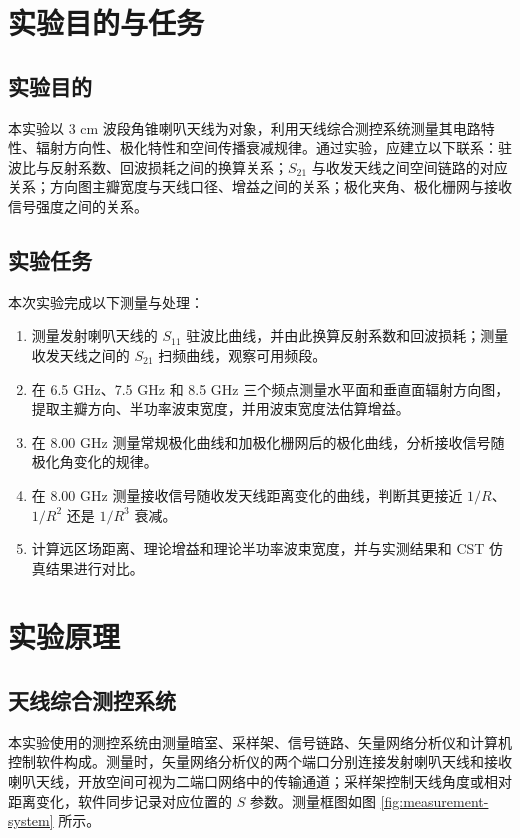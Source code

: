 \documentclass{ctexart}
\begin{document}
\makecover
\makecoveri
\zdx

\section{实验目的与任务}

\subsection{实验目的}

本实验以 3 cm 波段角锥喇叭天线为对象，利用天线综合测控系统测量其电路特性、辐射方向性、极化特性和空间传播衰减规律。通过实验，应建立以下联系：驻波比与反射系数、回波损耗之间的换算关系；$S_{21}$ 与收发天线之间空间链路的对应关系；方向图主瓣宽度与天线口径、增益之间的关系；极化夹角、极化栅网与接收信号强度之间的关系。

\subsection{实验任务}

本次实验完成以下测量与处理：
\begin{enumerate}
  \item 测量发射喇叭天线的 $S_{11}$ 驻波比曲线，并由此换算反射系数和回波损耗；测量收发天线之间的 $S_{21}$ 扫频曲线，观察可用频段。
  \item 在 6.5 GHz、7.5 GHz 和 8.5 GHz 三个频点测量水平面和垂直面辐射方向图，提取主瓣方向、半功率波束宽度，并用波束宽度法估算增益。
  \item 在 8.00 GHz 测量常规极化曲线和加极化栅网后的极化曲线，分析接收信号随极化角变化的规律。
  \item 在 8.00 GHz 测量接收信号随收发天线距离变化的曲线，判断其更接近 $1/R$、$1/R^2$ 还是 $1/R^3$ 衰减。
  \item 计算远区场距离、理论增益和理论半功率波束宽度，并与实测结果和 CST 仿真结果进行对比。
\end{enumerate}

\section{实验原理}

\subsection{天线综合测控系统}

本实验使用的测控系统由测量暗室、采样架、信号链路、矢量网络分析仪和计算机控制软件构成。测量时，矢量网络分析仪的两个端口分别连接发射喇叭天线和接收喇叭天线，开放空间可视为二端口网络中的传输通道；采样架控制天线角度或相对距离变化，软件同步记录对应位置的 $S$ 参数。测量框图如图 \ref{fig:measurement-system} 所示。
\end{document}
